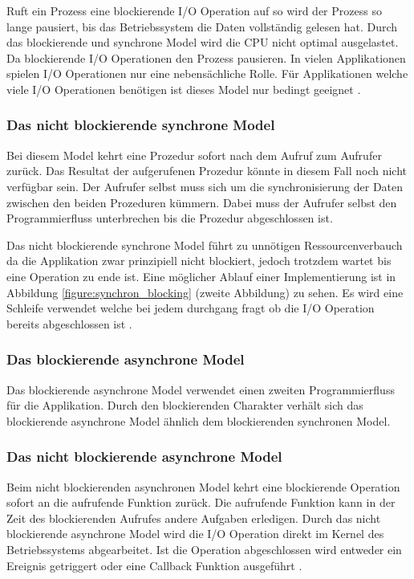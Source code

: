 Ruft ein Prozess eine blockierende I/O Operation auf so wird der Prozess so lange pausiert, bis das Betriebssystem die Daten vollständig gelesen hat. Durch das blockierende und synchrone Model wird die CPU nicht optimal ausgelastet. Da blockierende I/O Operationen den Prozess pausieren. In vielen Applikationen spielen I/O Operationen nur eine nebensächliche Rolle. Für Applikationen welche viele I/O Operationen benötigen ist dieses Model nur bedingt geeignet \cite[p. 48]{Erb2012}.


\subsubsection{Das nicht blockierende synchrone Model}

Bei diesem Model kehrt eine Prozedur sofort nach dem Aufruf zum Aufrufer zurück. Das Resultat der aufgerufenen Prozedur könnte in diesem Fall noch nicht verfügbar sein. Der Aufrufer selbst muss sich um die synchronisierung der Daten zwischen den beiden Prozeduren kümmern. Dabei muss der Aufrufer selbst den Programmierfluss unterbrechen bis die Prozedur abgeschlossen ist. 

Das nicht blockierende synchrone Model führt zu unnötigen Ressourcenverbauch da die Applikation zwar prinzipiell nicht blockiert, jedoch trotzdem wartet bis eine Operation zu ende ist. Eine möglicher Ablauf einer Implementierung ist in Abbildung \ref{figure:synchron_blocking} (zweite Abbildung) zu sehen. Es wird eine Schleife verwendet welche bei jedem durchgang fragt ob die I/O Operation bereits abgeschlossen ist \cite[p. 48]{Erb2012}.

\subsubsection{Das blockierende asynchrone Model}

Das blockierende asynchrone Model verwendet einen zweiten Programmierfluss für die Applikation. Durch den blockierenden Charakter verhält sich das blockierende asynchrone Model ähnlich dem blockierenden synchronen Model. 

\subsubsection{Das nicht blockierende asynchrone Model}
Beim nicht blockierenden asynchronen Model kehrt eine blockierende Operation sofort an die aufrufende Funktion zurück. Die aufrufende Funktion kann in der Zeit des blockierenden Aufrufes andere Aufgaben erledigen. Durch das nicht blockierende asynchrone Model wird die I/O Operation direkt im Kernel des Betriebssystems abgearbeitet. Ist die Operation abgeschlossen wird entweder ein Ereignis getriggert oder eine Callback Funktion ausgeführt \cite[p. 48]{Erb2012}.

